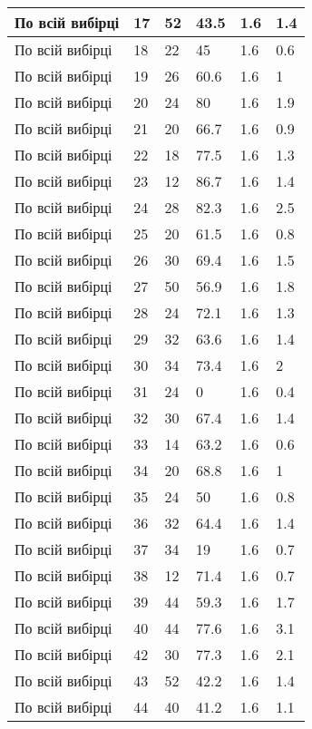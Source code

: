 \begin{longtable}[c]{ | p{2cm} | p{2cm} | p{2cm} | p{2cm} | p{3cm} | p{3cm} | }
	\hline
	По всій вибірці & 17 & 52 & 43.5 & 1.6 & 1.4 \\
	\hline
	По всій вибірці & 18 & 22 & 45 & 1.6 & 0.6 \\
	\hline
	По всій вибірці & 19 & 26 & 60.6 & 1.6 & 1 \\
	\hline
	По всій вибірці & 20 & 24 & 80 & 1.6 & 1.9 \\
	\hline
	По всій вибірці & 21 & 20 & 66.7 & 1.6 & 0.9 \\
	\hline
	По всій вибірці & 22 & 18 & 77.5 & 1.6 & 1.3 \\
	\hline
	По всій вибірці & 23 & 12 & 86.7 & 1.6 & 1.4 \\
	\hline
	По всій вибірці & 24 & 28 & 82.3 & 1.6 & 2.5 \\
	\hline
	По всій вибірці & 25 & 20 & 61.5 & 1.6 & 0.8 \\
	\hline
	По всій вибірці & 26 & 30 & 69.4 & 1.6 & 1.5 \\
	\hline
	По всій вибірці & 27 & 50 & 56.9 & 1.6 & 1.8 \\
	\hline
	По всій вибірці & 28 & 24 & 72.1 & 1.6 & 1.3 \\
	\hline
	По всій вибірці & 29 & 32 & 63.6 & 1.6 & 1.4 \\
	\hline
	По всій вибірці & 30 & 34 & 73.4 & 1.6 & 2 \\
	\hline
	По всій вибірці & 31 & 24 & 0 & 1.6 & 0.4 \\
	\hline
	По всій вибірці & 32 & 30 & 67.4 & 1.6 & 1.4 \\
	\hline
	По всій вибірці & 33 & 14 & 63.2 & 1.6 & 0.6 \\
	\hline
	По всій вибірці & 34 & 20 & 68.8 & 1.6 & 1 \\
	\hline
	По всій вибірці & 35 & 24 & 50 & 1.6 & 0.8 \\
	\hline
	По всій вибірці & 36 & 32 & 64.4 & 1.6 & 1.4 \\
	\hline
	По всій вибірці & 37 & 34 & 19 & 1.6 & 0.7 \\
	\hline
	По всій вибірці & 38 & 12 & 71.4 & 1.6 & 0.7 \\
	\hline
	По всій вибірці & 39 & 44 & 59.3 & 1.6 & 1.7 \\
	\hline
	По всій вибірці & 40 & 44 & 77.6 & 1.6 & 3.1 \\
	\hline
	По всій вибірці & 42 & 30 & 77.3 & 1.6 & 2.1 \\
	\hline
	По всій вибірці & 43 & 52 & 42.2 & 1.6 & 1.4 \\
	\hline
	По всій вибірці & 44 & 40 & 41.2 & 1.6 & 1.1 \\

\end{longtable}
